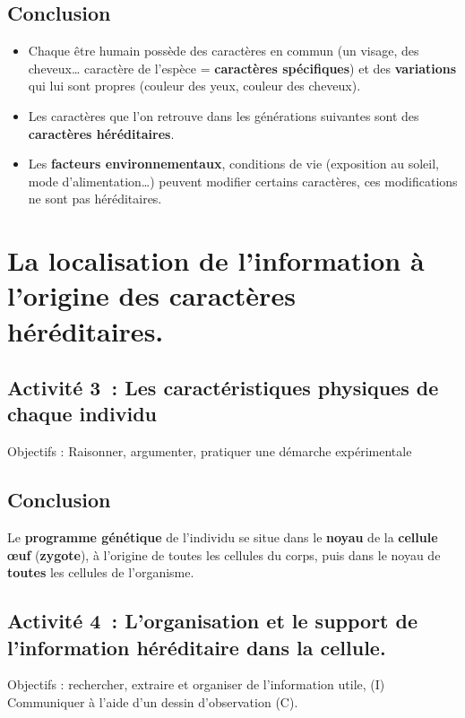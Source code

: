 \subsection{Conclusion}

\begin{itemize}
\item
  Chaque être humain possède des caractères en commun (un visage, des
  cheveux\ldots{} caractère de l'espèce = \textbf{caractères
  spécifiques}) et des \textbf{variations} qui lui sont propres (couleur
  des yeux, couleur des cheveux).
\item
  Les caractères que l'on retrouve dans les générations suivantes sont
  des \textbf{caractères héréditaires}.
\item
  Les \textbf{facteurs environnementaux}, conditions de vie (exposition
  au soleil, mode d'alimentation\ldots{}) peuvent modifier certains
  caractères, ces modifications ne sont pas héréditaires.
\end{itemize}

\section{La localisation de l'information à l'origine des caractères
héréditaires.}
\label{sec:chap1:localisation}

\subsection{Activité 3~: Les caractéristiques physiques de chaque individu}
Objectifs : Raisonner, argumenter, pratiquer une démarche expérimentale

\subsection{Conclusion}

Le \textbf{programme génétique} de l'individu se situe dans le
\textbf{noyau} de la \textbf{cellule œuf} (\textbf{zygote}), à l'origine
de toutes les cellules du corps, puis dans le noyau de \textbf{toutes}
les cellules de l'organisme.

\subsection{Activité 4~: L'organisation et le support de l'information héréditaire
dans la cellule.}
Objectifs : rechercher, extraire et organiser de l'information utile,
(I)\\
Communiquer à l'aide d'un dessin d'observation (C).

